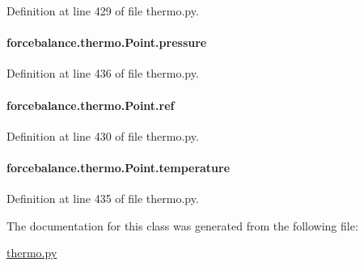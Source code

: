 Definition at line 429 of file thermo.\-py.

\hypertarget{classforcebalance_1_1thermo_1_1Point_a230955ba4f97b8e1d68c2bf3f42ef4db}{
\paragraph[{pressure}]{\setlength{\rightskip}{0pt plus 5cm}forcebalance.\-thermo.\-Point.\-pressure}}\label{classforcebalance_1_1thermo_1_1Point_a230955ba4f97b8e1d68c2bf3f42ef4db}


Definition at line 436 of file thermo.\-py.

\hypertarget{classforcebalance_1_1thermo_1_1Point_aa536046c590bb0dfb931d9789060ee27}{
\paragraph[{ref}]{\setlength{\rightskip}{0pt plus 5cm}forcebalance.\-thermo.\-Point.\-ref}}\label{classforcebalance_1_1thermo_1_1Point_aa536046c590bb0dfb931d9789060ee27}


Definition at line 430 of file thermo.\-py.

\hypertarget{classforcebalance_1_1thermo_1_1Point_a83426895d5ab01fbd7080070292e0e2d}{
\paragraph[{temperature}]{\setlength{\rightskip}{0pt plus 5cm}forcebalance.\-thermo.\-Point.\-temperature}}\label{classforcebalance_1_1thermo_1_1Point_a83426895d5ab01fbd7080070292e0e2d}


Definition at line 435 of file thermo.\-py.



The documentation for this class was generated from the following file\-:\begin{DoxyCompactItemize}
\item 
\hyperlink{thermo_8py}{thermo.\-py}\end{DoxyCompactItemize}
